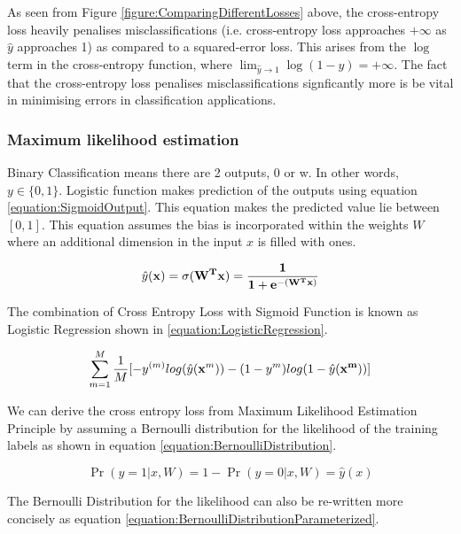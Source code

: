 \documentclass[a4paper,12pt]{article}
\begin{document}
As seen from Figure \ref{figure:ComparingDifferentLosses} above, the cross-entropy loss heavily penalises misclassifications (i.e. cross-entropy loss approaches $+ \infty$ as $\hat{y}$ approaches 1) as compared to a squared-error loss. This arises from the $\log$ term in the cross-entropy function, where $\lim_{\hat{y} \rightarrow 1} \log(1 - \hat{y}) = + \infty$. The fact that the cross-entropy loss penalises misclassifications signficantly more is be vital in minimising errors in classification applications.

\clearpage
\subsubsection{Maximum likelihood estimation}
Binary Classification means there are 2 outputs, 0 or w. In other words, $y \in \{0,1\}$. 
Logistic function  makes prediction of the outputs using equation \ref{equation:SigmoidOutput}. This equation makes the predicted value lie between $[0,1]$. 
This equation assumes the bias is incorporated within the weights $W$ where an additional dimension in the input $x$ is filled with ones. 

\begin{equation}
\label{equation:SigmoidOutput}
\hat{y}(\bf{x}) = \sigma(W^{T}\mathbf{x}) = \frac{1}{1+e^{-(W^{T}\mathbf{x})}}
\end{equation}


The combination of Cross Entropy Loss with Sigmoid Function is known as Logistic Regression shown in \ref{equation:LogisticRegression}. 

\begin{equation}
\label{equation:LogisticRegression}
\sum_{m=1}^{M}\frac{1}{M}[-y^{(m)}log(\hat{y}(\mathbf{x}^{m})) - (1-y^{m})log(1-\hat{y}(\bf{x}^{m}))]
\end{equation}

We can derive the cross entropy loss from Maximum Likelihood Estimation Principle by assuming a Bernoulli distribution for the likelihood of the training labels as shown in equation \ref{equation:BernoulliDistribution}. 

\begin{equation}
\label{equation:BernoulliDistribution}
\Pr(y=1|x, W) = 1 - \Pr(y=0|x, W) = \hat{y}(x)
\end{equation}

The Bernoulli Distribution for the likelihood can also be re-written more concisely as equation \ref{equation:BernoulliDistributionParameterized}. 
\end{document}
